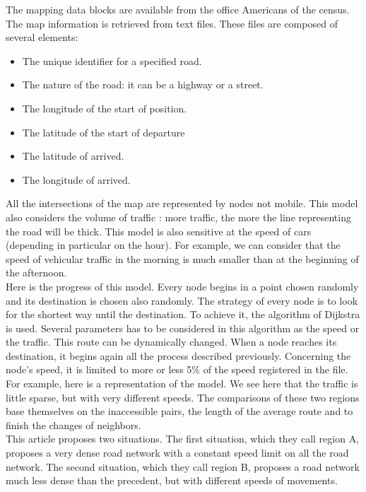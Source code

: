 The mapping data blocks are available from the office Americans of the census. The map information is retrieved from text files. These files are composed of several elements:

\begin{itemize}
\item The unique identifier for a specified road.
\item The nature of the road: it can be a highway or a street.
\item The longitude of the start of position.
\item The latitude of the start of departure
\item The latitude of arrived.
\item The longitude of arrived.
\end{itemize}

All the intersections of the map are represented by nodes not mobile.
This model also considers the volume of traffic : more traffic, the more the line representing the road will be thick.
This model is also sensitive at the speed of cars (depending in particular on the hour). For example, we can consider that the speed of vehicular traffic in the morning is much smaller than at the beginning of the afternoon.\\

Here is the progress of this model. Every node begins in a point chosen randomly and its destination is chosen also randomly. The strategy of every node is to look for the shortest way until the destination. To achieve it, the algorithm of Dijkstra is used. Several parameters has to be considered in this algorithm as the speed or the traffic. This route can be dynamically changed. When a node reaches its destination, it begins again all the process described previously. Concerning the node's speed, it is limited to more or less 5\% of the speed registered in the file.\\
For example, here is a representation of the model. We see here that the traffic is little sparse, but with very different speeds. The comparisons of these two regions base themselves on the inaccessible pairs, the length of the average route and to finish the changes of neighbors.\\

This article proposes two situations.
The first situation, which they call region A, proposes a very dense road network with a constant speed limit on all the road network. The second situation, which they call region B, proposes a road network much less dense than the precedent, but with different speeds of movements.


